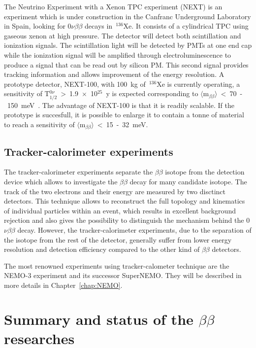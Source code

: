\documentclass[main.tex]{subfiles}
\begin{document}
\NI The Neutrino Experiment with a Xenon TPC experiment (NEXT) is an experiment which is under construction in the Canfranc Underground Laboratory in Spain, looking for 0$\nu\beta\beta$ decays in~$^{\text{136}}$Xe. It consists of a cylindrical TPC using gaseous xenon at high pressure. The detector will detect both scintillation and ionization signals. The scintillation light will be detected by PMTs at one end cap while the ionization signal will be amplified through electroluminescence to produce a signal that can be read out by silicon PM. This second signal provides tracking information and allows improvement of the energy resolution. A prototype detector, NEXT-100, with 100~kg of~$^{\text{136}}$Xe is currently operating, a sensitivity of T$_{\text{1/2}}^{0\nu}$~>~1.9~$\times$~10$^{\text{25}}$~y is expected corresponding to $\langle \text{m}_{\beta\beta} \rangle$~<~70~-~150~meV~\cite{NEXT}. The advantage of NEXT-100 is that it is readily scalable. If the prototype is succesfull, it is possible to enlarge it to contain a tonne of material to reach a sensitivity of $\langle \text{m}_{\beta\beta} \rangle$~<~15~-~32~meV.



\subsection{Tracker-calorimeter experiments}


\NI The tracker-calorimeter experiments separate the $\beta\beta$ isotope from the detection device which allows to investigate the $\beta\beta$ decay for many candidate isotope. The track of the two electrons and their energy are measured by two disctinct detectors. This technique allows to reconstruct the full topology and kinematics of individual particles within an event, which results in excellent background rejection and also gives the possibility to distinguish the mechanism behind the 0$\nu\beta\beta$ decay. However, the tracker-calorimeter experiments, due to the separation of the isotope from the rest of the detector, generally suffer from lower energy resolution and detection efficiency compared to the other kind of $\beta\beta$ detectors. 


\bigskip


\NI The most renowned experiments using tracker-calometer technique are the NEMO-3 experiment and its successor SuperNEMO. They will be described in more details in Chapter~\ref{chap:NEMO}.


\section{Summary and status of the $\beta\beta$ researches}\label{sec:StatusDBD}
\end{document}
